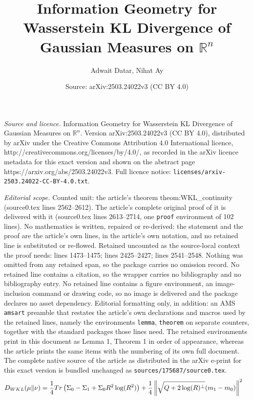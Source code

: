\documentclass[10pt,a4paper]{amsart}
\title{Information Geometry for Wasserstein KL Divergence of Gaussian Measures on \(\mathbb{R}^n\)}
\author{Adwait Datar, Nihat Ay}
\date{Source: arXiv:2503.24022v3 (CC BY 4.0)}
\newcommand{\Perp}[1]{#1^{\perp}}
\newcommand{\trace}[1]{\textnormal{Tr}\left({#1}\right)}
\begin{document}
\maketitle

\noindent\emph{Source and licence.} Information Geometry for Wasserstein KL Divergence of Gaussian Measures on \(\mathbb{R}^n\). Version arXiv:2503.24022v3 (CC BY 4.0), distributed by arXiv under the Creative Commons Attribution 4.0 International licence, http://creativecommons.org/licenses/by/4.0/, as recorded in the arXiv licence metadata for this exact version and shown on the abstract page https://arxiv.org/abs/2503.24022v3. Full licence notice: \texttt{licenses/arxiv-2503.24022-CC-BY-4.0.txt}.\par\smallskip

\noindent\textit{Editorial scope.} Counted unit: the article's theorem theom:WKL\_continuity (source0.tex lines 2562--2612). The article's complete original proof of it is delivered with it (source0.tex lines 2613--2714, one \texttt{proof} environment of 102 lines). No mathematics is written, repaired or re-derived: the statement and the proof are the article's own lines, in the article's own notation, and no retained line is substituted or re-flowed.  Retained uncounted as the source-local context the proof needs: lines 1473--1475; lines 2425--2427; lines 2541--2548.  Nothing was omitted from any retained span, so the package carries no omission record.  No retained line contains a citation, so the wrapper carries no bibliography and no bibliography entry.  No retained line contains a figure environment, an image-inclusion command or drawing code, so no image is delivered and the package declares no asset dependency.  Editorial formatting only, in addition: an AMS \texttt{amsart} preamble that restates the article's own declarations and macros used by the retained lines, namely the environments \texttt{lemma}, \texttt{theorem} on separate counters, together with the standard packages those lines need.  The retained environments print in this document as Lemma 1, Theorem 1 in order of appearance, whereas the article prints the same items with the numbering of its own full document.  The complete native source of the article as distributed in the arXiv e-print for this exact version is bundled unchanged as \texttt{sources/175687/source0.tex}.
\begin{align}\label{eq:D_main_formula}  
    D_{\rm WKL}(\mu \| \nu) &= \frac{1}{4}\trace{\Sigma_0-\Sigma_1+\Sigma_0R^2\log(R^2)} +\frac{1}{4}\left\lVert \sqrt{Q+2\Perp{\log(R)}} (m_1-m_0) \right\rVert^2
\end{align}
\end{document}

